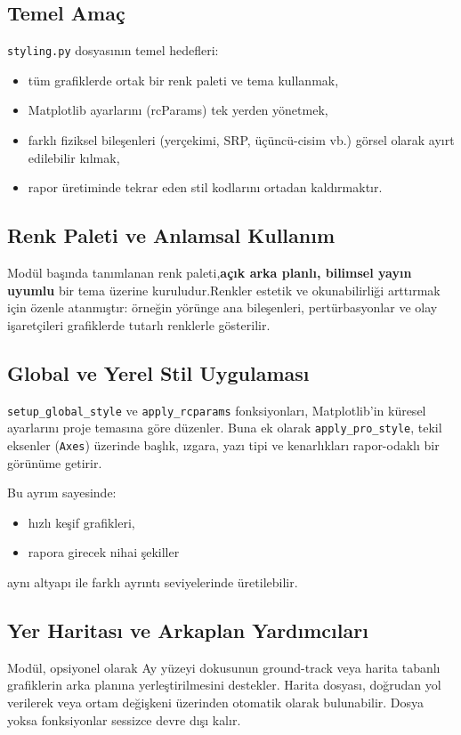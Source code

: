 \subsection*{Temel Amaç}
\texttt{styling.py} dosyasının temel hedefleri:
\begin{itemize}
  \item tüm grafiklerde ortak bir renk paleti ve tema kullanmak,
  \item Matplotlib ayarlarını (rcParams) tek yerden yönetmek,
  \item farklı fiziksel bileşenleri (yerçekimi, SRP, üçüncü-cisim vb.)
        görsel olarak ayırt edilebilir kılmak,
  \item rapor üretiminde tekrar eden stil kodlarını ortadan kaldırmaktır.
\end{itemize}

\subsection*{Renk Paleti ve Anlamsal Kullanım}
Modül başında tanımlanan renk paleti,\textbf{açık arka planlı, bilimsel yayın uyumlu} bir tema üzerine kuruludur.Renkler estetik ve okunabilirliği arttırmak için özenle atanmıştır:
örneğin yörünge ana bileşenleri, pertürbasyonlar ve olay işaretçileri grafiklerde tutarlı renklerle gösterilir.


\subsection*{Global ve Yerel Stil Uygulaması}
\texttt{setup\_global\_style} ve \texttt{apply\_rcparams} fonksiyonları,
Matplotlib'in küresel ayarlarını proje temasına göre düzenler.
Buna ek olarak \texttt{apply\_pro\_style},
tekil eksenler (\texttt{Axes}) üzerinde
başlık, ızgara, yazı tipi ve kenarlıkları
rapor-odaklı bir görünüme getirir.

Bu ayrım sayesinde:
\begin{itemize}
  \item hızlı keşif grafikleri,
  \item rapora girecek nihai şekiller
\end{itemize}
aynı altyapı ile farklı ayrıntı seviyelerinde üretilebilir.

\subsection*{Yer Haritası ve Arkaplan Yardımcıları}
Modül, opsiyonel olarak Ay yüzeyi dokusunun
ground-track veya harita tabanlı grafiklerin arka planına
yerleştirilmesini destekler.
Harita dosyası, doğrudan yol verilerek veya
ortam değişkeni üzerinden otomatik olarak bulunabilir.
Dosya yoksa fonksiyonlar sessizce devre dışı kalır.

